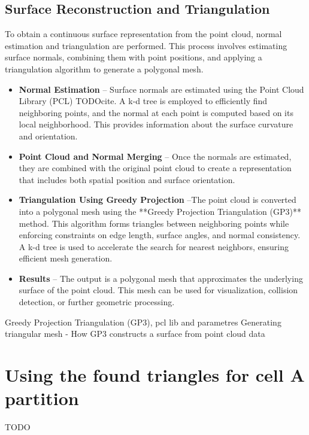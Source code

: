         \subsection{Surface Reconstruction and Triangulation}
            To obtain a continuous surface representation from the point cloud, normal estimation and triangulation are performed. 
            This process involves estimating surface normals, combining them with point positions, and applying a triangulation algorithm to generate a polygonal mesh.
            \begin{itemize}
                \item \textbf{Normal Estimation} -- Surface normals are estimated using the Point Cloud Library (PCL) TODOcite. 
                A k-d tree is employed to efficiently find neighboring points, and the normal at each point is computed based on its local neighborhood. 
                This provides information about the surface curvature and orientation.
                \item \textbf{Point Cloud and Normal Merging} -- Once the normals are estimated, they are combined with the original point cloud to create a representation that includes both spatial position and surface orientation.
                \item \textbf{Triangulation Using Greedy Projection} --The point cloud is converted into a polygonal mesh using the **Greedy Projection Triangulation (GP3)** method. 
                This algorithm forms triangles between neighboring points while enforcing constraints on edge length, surface angles, and normal consistency. 
                A k-d tree is used to accelerate the search for nearest neighbors, ensuring efficient mesh generation.
                \item \textbf{Results} -- The output is a polygonal mesh that approximates the underlying surface of the point cloud. 
                This mesh can be used for visualization, collision detection, or further geometric processing.
            \end{itemize}
            
            Greedy Projection Triangulation (GP3), pcl lib and parametres
            Generating triangular mesh - How GP3 constructs a surface from point cloud data
    
    \section{Using the found triangles for cell A partition}
        TODO
